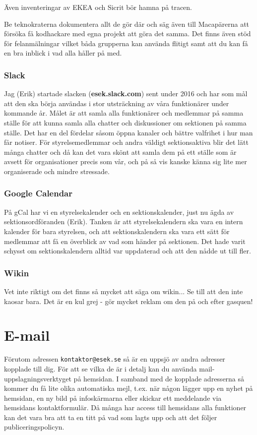 \documentclass[10pt]{article}
\begin{document}
Även inventeringar av EKEA och Sicrit bör hamna på tracen.

Be teknokraterna dokumentera allt de gör där och säg även till Macapärerna att försöka få kodhackare med egna projekt att göra det samma. Det finns även stöd för felanmälningar vilket båda grupperna kan använda flitigt samt att du kan få en bra inblick i vad alla håller på med.

\subsubsection{Slack}
Jag (Erik) startade slacken (\textbf{esek.slack.com}) sent under 2016 och har som mål att den ska börja användas i stor utsträckning av våra funktionärer under kommande år. Målet är att samla alla funktionärer och medlemmar på samma ställe för att kunna samla alla chatter och diskussioner om sektionen på samma ställe. Det har en del fördelar såsom öppna kanaler och bättre valfrihet i hur man får notiser. För styrelsemedlemmar och andra väldigt sektionsaktiva blir det lätt många chatter och då kan det vara skönt att samla dem på ett ställe som är avsett för organisationer precis som vår, och på så vis kanske känna sig lite mer organiserade och mindre stressade.

\subsubsection{Google Calendar}
På gCal har vi en styrelsekalender och en sektionskalender, just nu ägda av sektionsordföranden (Erik). Tanken är att styrelsekalendern ska vara en intern kalender för bara styrelsen, och att sektionskalendern ska vara ett sätt för medlemmar att få en överblick av vad som händer på sektionen. Det hade varit schysst om sektionskalendern alltid var uppdaterad och att den nådde ut till fler.

\subsubsection{Wikin}
Vet inte riktigt om det finns så mycket att säga om wikin... Se till att den inte kaosar bara. Det är en kul grej - gör mycket reklam om den på och efter gasquen!

\section{E-mail}
Förutom adressen \texttt{kontaktor@esek.se} så är en uppsjö av andra adresser kopplade till dig. För att se vilka de är i detalj kan du använda mail-uppslagningsverktyget på hemsidan. I samband med de kopplade adresserna så kommer du få lite olika automatiska mejl, t.ex. när någon lägger upp en nyhet på hemsidan, en ny bild på infoskärmarna eller skickar ett meddelande via hemsidans kontaktformulär. Då många har access till hemsidans alla funktioner kan det vara bra att ta en titt på vad som lagts upp och att det följer publiceringspolicyn.
\end{document}
